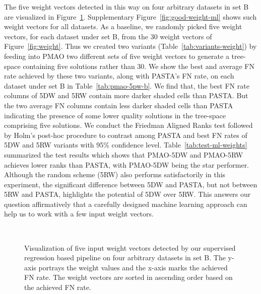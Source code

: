 The five weight vectors detected in this way on four arbitrary datasets in set B are visualized in Figure~\ref{fig:some-good-weight-ml}. Supplementary Figure~\ref{fig:good-weight-ml} shows such weight vectors for all datasets. As a baseline, we randomly picked five weight vectors, for each dataset under set B, from the 30 weight vectors of Figure~\ref{fig:weight}. Thus we created two variants (Table~\ref{tab:variants-weight}) by feeding into PMAO two different sets of five weight vectors to generate a tree-space containing five solutions rather than 30. We show the best and average FN rate achieved by these two variants, along with PASTA's FN rate, on each dataset under set B in Table~\ref{tab:pmao-5pw-b}. We find that, the best FN rate columns of 5DW and 5RW contain more darker shaded cells than PASTA. But the two average FN columns contain less darker shaded cells than PASTA indicating the presence of some lower quality solutions in the tree-space comprising five solutions. We conduct the Friedman Aligned Ranks test followed by Holm's post-hoc procedure to contrast among PASTA and best FN rates of 5DW and 5RW variants with 95\% confidence level. Table~\ref{tab:test-ml-weights} summarized the test results which shows that PMAO-5DW and PMAO-5RW achieves lower ranks than PASTA, with PMAO-5DW being the star performer. Although the random scheme (5RW) also performs satisfactorily in this experiment, the significant difference between 5DW and PASTA, but not between 5RW and PASTA, highlights the potential of 5DW over 5RW. This answers our question affirmatively that a carefully designed machine learning approach can help us to work with a few input weight vectors.

\begin{figure}[!htbp]%
	\begin{adjustwidth}{-0.6cm}{}
		\centering
		\\
	\end{adjustwidth}
	\caption{Visualization of five input weight vectors detected by our supervised regression based pipeline on four arbitrary datasets in set B. The y-axis portrays the weight values and the x-axis marks the achieved FN rate. The weight vectors are sorted in ascending order based on the achieved FN rate. }
	\label{fig:some-good-weight-ml}
\end{figure}


